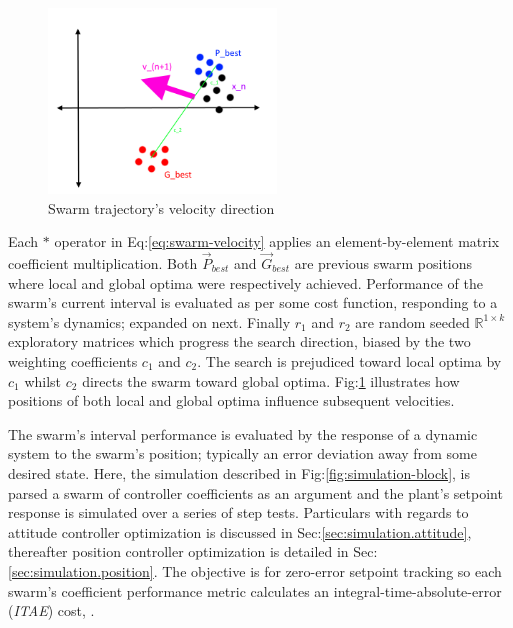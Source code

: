 \par
\begin{figure}[hbtp]
\vspace{-20pt}
\centering
\includegraphics[width=0.54\textwidth]{figs/swarm-trajectory}
\vspace{-10pt}
\caption{Swarm trajectory's velocity direction}
\label{fig:swarm-trajectory}
\vspace{-18pt}
\end{figure}
\par
Each $\ast$ operator in Eq:\ref{eq:swarm-velocity} applies an element-by-element matrix coefficient multiplication. Both $\vec{P}_{best}$ and $\vec{G}_{best}$ are previous swarm positions where local and global optima were respectively achieved. Performance of the swarm's current interval is evaluated as per some cost function, responding to a system's dynamics; expanded on next. Finally $r_1$ and $r_2$ are random seeded $\mathbb{R}^{1\times k}$ exploratory matrices which progress the search direction, biased by the two weighting coefficients $c_1$ and $c_2$. The search is prejudiced toward local optima by $c_1$ whilst $c_2$ directs the swarm toward global optima. Fig:\ref{fig:swarm-trajectory} illustrates how positions of both local and global optima influence subsequent velocities.
\par
The swarm's interval performance is evaluated by the response of a dynamic system to the swarm's position;  typically an error deviation away from some desired state. Here, the simulation described in Fig:\ref{fig:simulation-block}, is parsed a swarm of controller coefficients as an argument and the plant's setpoint response is simulated over a series of step tests. Particulars with regards to attitude controller optimization is discussed in Sec:\ref{sec:simulation.attitude}, thereafter position controller optimization is detailed in Sec:\ref{sec:simulation.position}. The objective is for zero-error setpoint tracking so each swarm's coefficient performance metric calculates an integral-time-absolute-error (\emph{ITAE}) cost, \cite{ITAE}.

